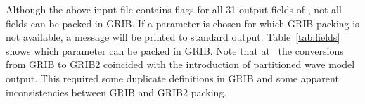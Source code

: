 Although the above input file contains flags for all 31 output fields of \ws,
not all fields can be packed in GRIB. If a parameter is chosen for which GRIB
packing is not available, a message will be printed to standard
output. Table~\ref{tab:fields} shows which parameter can be packed in GRIB.
Note that at \ncep\ the conversions from GRIB to GRIB2 coincided with the
introduction of partitioned wave model output. This required some duplicate
definitions in GRIB and some apparent inconsistencies between GRIB and GRIB2
packing.

\pb